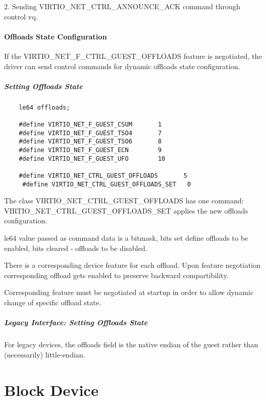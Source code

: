 2. Sending VIRTIO_NET_CTRL_ANNOUNCE_ACK command through control
  vq.

\paragraph{Offloads State Configuration}\label{sec:Device Types / Network Device / Device Operation / Control Virtqueue / Offloads State Configuration}

If the VIRTIO_NET_F_CTRL_GUEST_OFFLOADS feature is negotiated, the driver can
send control commands for dynamic offloads state configuration.

\subparagraph{Setting Offloads State}\label{sec:Device Types / Network Device / Device Operation / Control Virtqueue / Offloads State Configuration / Setting Offloads State}

\begin{lstlisting}
	le64 offloads;

	#define VIRTIO_NET_F_GUEST_CSUM       1
	#define VIRTIO_NET_F_GUEST_TSO4       7
	#define VIRTIO_NET_F_GUEST_TSO6       8
	#define VIRTIO_NET_F_GUEST_ECN        9
	#define VIRTIO_NET_F_GUEST_UFO        10

	#define VIRTIO_NET_CTRL_GUEST_OFFLOADS       5
	 #define VIRTIO_NET_CTRL_GUEST_OFFLOADS_SET   0
\end{lstlisting}

The class VIRTIO_NET_CTRL_GUEST_OFFLOADS has one command:
VIRTIO_NET_CTRL_GUEST_OFFLOADS_SET applies the new offloads configuration.

le64 value passed as command data is a bitmask, bits set define
offloads to be enabled, bits cleared - offloads to be disabled.

There is a corresponding device feature for each offload. Upon feature
negotiation corresponding offload gets enabled to preserve backward
compartibility.

Corresponding feature must be negotiated at startup in order to allow dynamic
change of specific offload state.


\subparagraph{Legacy Interface: Setting Offloads State}\label{sec:Device Types / Network Device / Device Operation / Control Virtqueue / Offloads State Configuration / Setting Offloads State / Legacy Interface: Setting Offloads State}
For legacy devices, the offloads field is the
native endian of the guest rather than (necessarily) little-endian.


\section{Block Device}\label{sec:Device Types / Block Device}

